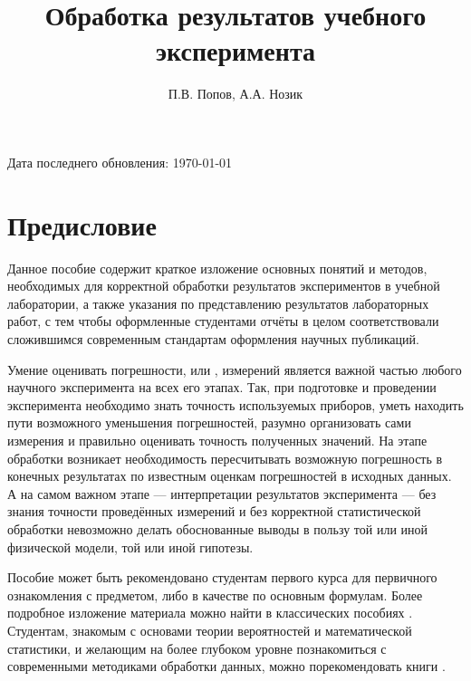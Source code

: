 \documentclass[a5paper,10pt,oneside]{report}
\begin{document}
\title{Обработка результатов учебного эксперимента}
\author{П.В. Попов, А.А. Нозик}

\maketitle


Дата последнего обновления: \today


\tableofcontents

\listoftodos

\chapter*{Предисловие}
    Данное пособие содержит краткое изложение основных понятий и методов,
    необходимых для корректной обработки результатов экспериментов в учебной
    лаборатории, а также указания по представлению результатов лабораторных
    работ, с тем чтобы оформленные студентами отчёты в целом соответствовали
    сложившимся современным стандартам оформления научных публикаций.

    Умение оценивать погрешности, или , измерений
    является важной частью любого научного эксперимента на всех его этапах.
    Так, при подготовке и проведении эксперимента необходимо знать точность
    используемых приборов, уметь находить пути возможного уменьшения погрешностей,
    разумно организовать сами измерения и правильно оценивать точность
    полученных значений. На этапе обработки возникает необходимость пересчитывать
    возможную погрешность в конечных результатах по известным оценкам погрешностей
    в исходных данных. А на самом важном этапе --- интерпретации
    результатов эксперимента --- без знания точности проведённых
    измерений и без корректной статистической обработки невозможно делать
    обоснованные выводы в пользу той или иной физической модели, той или
    иной гипотезы.

    Пособие может быть рекомендовано студентам первого курса для первичного
    ознакомления с предметом, либо в качестве 
    по основным формулам. Более подробное изложение материала 
    можно найти в классических пособиях \cite{taylor,squires,zaidel}. 
    Студентам, знакомым с основами теории вероятностей и математической 
    статистики, и желающим на более глубоком уровне познакомиться с современными методиками обработки данных, можно порекомендовать книги \cite{hudson,idie}.
\end{document}
